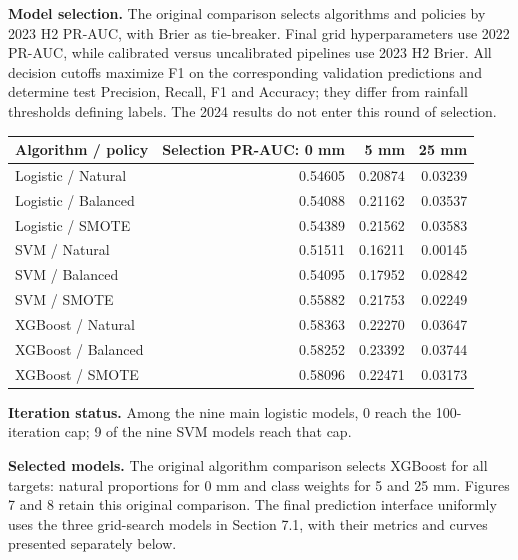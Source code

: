 \documentclass[UTF8,fontset=fandol,10pt,a4paper,landscape]{ctexart}
\begin{document}
\textbf{Model selection.} The original comparison selects algorithms and policies by 2023 H2 PR-AUC, with Brier as tie-breaker. Final grid hyperparameters use 2022 PR-AUC, while calibrated versus uncalibrated pipelines use 2023 H2 Brier. All decision cutoffs maximize F1 on the corresponding validation predictions and determine test Precision, Recall, F1 and Accuracy; they differ from rainfall thresholds defining labels. The 2024 results do not enter this round of selection.

\begin{center}\begin{tabular}{lrrr}\toprule
Algorithm / policy & Selection PR-AUC: 0 mm & 5 mm & 25 mm\\\midrule
Logistic / Natural & 0.54605 & 0.20874 & 0.03239\\
Logistic / Balanced & 0.54088 & 0.21162 & 0.03537\\
Logistic / SMOTE & 0.54389 & 0.21562 & 0.03583\\
SVM / Natural & 0.51511 & 0.16211 & 0.00145\\
SVM / Balanced & 0.54095 & 0.17952 & 0.02842\\
SVM / SMOTE & 0.55882 & 0.21753 & 0.02249\\
XGBoost / Natural & 0.58363 & 0.22270 & 0.03647\\
XGBoost / Balanced & 0.58252 & 0.23392 & 0.03744\\
XGBoost / SMOTE & 0.58096 & 0.22471 & 0.03173\\
\bottomrule\end{tabular}\end{center}

\textbf{Iteration status.} Among the nine main logistic models, 0 reach the 100-iteration cap; 9 of the nine SVM models reach that cap.

\textbf{Selected models.} The original algorithm comparison selects XGBoost for all targets: natural proportions for 0 mm and class weights for 5 and 25 mm. Figures 7 and 8 retain this original comparison. The final prediction interface uniformly uses the three grid-search models in Section 7.1, with their metrics and curves presented separately below.
\end{document}
